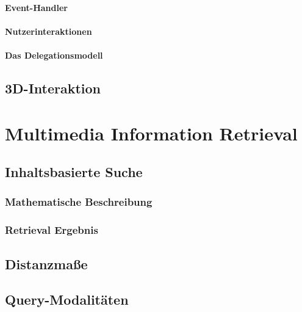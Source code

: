\documentclass[a4paper, 11pt, accentcolor = tud3b]{tudreport}
\begin{document}
				\subsubsection{Event-Handler} %

				\subsubsection{Nutzerinteraktionen} %

				\subsubsection{Das Delegationsmodell} %

		\section{3D-Interaktion} %

	\chapter{Multimedia Information Retrieval} %

		\section{Inhaltsbasierte Suche} %

			\subsection{Mathematische Beschreibung} %

			\subsection{Retrieval Ergebnis} %

		\section{Distanzmaße} %

		\section{Query-Modalitäten} %
\end{document}
